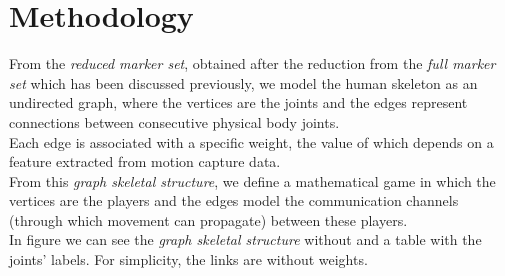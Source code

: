 \chapter{Methodology}
From the \textit{reduced marker set}, obtained after the reduction from the \textit{full marker set} which has been discussed previously, we model the human skeleton as an undirected graph, where the vertices are the joints and the edges represent connections between consecutive physical body joints.\\
Each edge is associated with a specific weight, the value of which depends on a feature extracted from motion capture data. \\
From this \textit{graph skeletal structure}, we define a mathematical game in which the vertices are the players and the edges model the communication channels (through which movement can propagate) between these players. \\
In figure we can see the \textit{graph skeletal structure} without and a table with the joints' labels.
For simplicity, the links are without weights.

